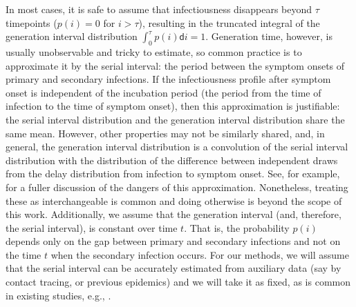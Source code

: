 \documentclass[10pt,letterpaper]{article}
\def\diff{\mathsf{d}}
\newcommand{\citep}[1]{\cite{#1}}
\begin{document}
In most cases, it is safe to assume that infectiousness disappears beyond 
$\tau$ timepoints ($p(i) = 0$ for $i > \tau$), resulting in the truncated integral 
of the generation interval distribution $\int_0^\tau p(i)\diff i = 1$.
Generation time, however, is usually unobservable and tricky to estimate, so
common practice is to approximate it by the serial interval: the period between
the symptom onsets of primary and secondary infections. If the infectiousness
profile after symptom onset is independent of the incubation period (the period
from the time of infection to the time of symptom onset), then this
approximation is justifiable: the serial interval distribution and the
generation interval distribution share the same mean. However, other properties
may not be similarly shared, and, in general, the generation interval
distribution is a convolution of the serial interval distribution with the
distribution of the difference between independent draws from the delay
distribution from infection to symptom onset. See, for example,
\cite{gostic2020practical} for a fuller discussion of the dangers of this
approximation. Nonetheless, treating these as interchangeable is common
\citep{cori2013new,park2021forward} and doing otherwise is beyond the scope of this work. 
Additionally, we assume that the generation interval (and, therefore, the 
serial interval), is constant over time $t$. That is, the probability $p(i)$ 
depends only on the gap between primary and secondary infections and not on 
the time $t$ when the secondary infection occurs. For our methods, we will 
assume that the serial interval can be accurately estimated from auxiliary 
data (say by contact tracing, or previous epidemics) and we will take it as 
fixed, as is common in existing studies, e.g., 
\cite{cori2013new,abry2020spatial,pascal2022nonsmooth}.
\end{document}
